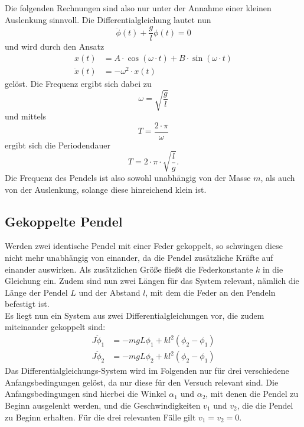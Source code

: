 Die folgenden Rechnungen sind also nur unter der Annahme einer kleinen Auslenkung sinnvoll.
Die Differentialgleichung lautet nun
\begin{equation*}
  \ddot{\phi}(t)+\frac{g}{l}\phi(t)=0
\end{equation*}
und wird durch den Ansatz
\begin{align*}
  x(t)        & =A\cdot \cos(\omega\cdot t)+B\cdot \sin(\omega\cdot t) \\
  \ddot{x}(t) & =-\omega^2\cdot x(t)
  \label{eq:ansatz}
\end{align*}
gelöst. Die Frequenz ergibt sich dabei zu
\begin{equation*}
  \omega=\sqrt{\frac{g}{l}}
\end{equation*}
und mittels
\begin{equation}
  \label{eq:schw}
  T=\frac{2 \cdot \pi}{\omega}
\end{equation}
ergibt sich die Periodendauer
\begin{equation}
  T=2 \cdot \pi \cdot \sqrt{\frac{l}{g}}.
  \label{eq:Periodendauer}
\end{equation}
Die Frequenz des Pendels ist also sowohl unabhängig von der Masse $m$, als auch von der Auslenkung, solange diese hinreichend klein ist.

\subsection{Gekoppelte Pendel}
Werden zwei identische Pendel mit einer Feder gekoppelt, so schwingen diese nicht mehr unabhängig von einander, da die Pendel zusätzliche Kräfte auf
einander auswirken. Als zusätzlichen Größe fließt die Federkonstante $k$ in die Gleichung ein. Zudem sind nun zwei Längen für das System relevant, nämlich die
Länge der Pendel $L$ und der Abstand $l$, mit dem die Feder an den Pendeln befestigt ist.
\\
Es liegt nun ein System aus zwei Differentialgleichungen vor, die zudem miteinander gekoppelt sind:
\begin{align*}
  J\ddot{\phi}_1 & =-mgL\phi_1+kl^2(\phi_2-\phi_1) \\
  J\ddot{\phi}_2 & =-mgL\phi_2+kl^2(\phi_2-\phi_1)
\end{align*}
Das Differentialgleichungs-System wird im Folgenden nur für drei verschiedene Anfangsbedingungen gelöst, da nur diese für den Versuch relevant sind.
Die Anfangsbedingungen sind hierbei die Winkel $\alpha_1$ und $\alpha_2$, mit denen die Pendel zu Beginn ausgelenkt werden, und die Geschwindigkeiten
$v_1$ und $v_2$, die die Pendel zu Beginn erhalten. Für die drei relevanten Fälle gilt $v_1=v_2=0$.

